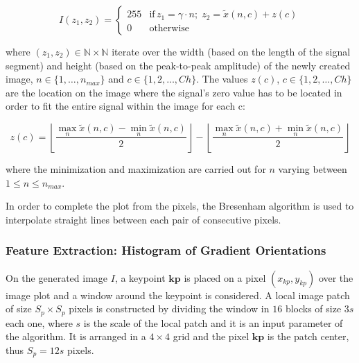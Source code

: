 \documentclass[utf8]{frontiersSCNS} %
\begin{document}
\begin{equation}
I(z_1,z_2) = \left\{ \begin{array}{rl}
255 & \text{if} \,  z_1 = \gamma \cdot n; \; z_2 = \tilde{x}(n,c) + z(c) \\
0   & \mbox{otherwise}
\end{array}\right.
\label{eq:images}
\end{equation}


\noindent where $ (z_1,z_2) \in \mathbb{N} \times \mathbb{N}$ iterate over the width (based on the length of the signal segment) and height (based on the peak-to-peak amplitude) of the newly created image,  $n \in \{1, \dots, n_{max}\}$ and $c \in \{1,2,\dots,Ch\}$.  The values $z(c)$, $c \in \{1,2,\dots,Ch\}$ are the location on the image where the signal's zero value has to be located in order to fit the entire signal within the image for each c:

\begin{equation}
z(c) = \left \lfloor{ \frac{\max_{n} \tilde{x}(n,c)  - \min_{n} \tilde{x}(n,c) }{2} }\right \rfloor -   \left \lfloor{ \frac{\max_{n} \tilde{x}(n,c)  + \min_{n} \tilde{x}(n,c)}{ 2} }\right \rfloor
\label{eq:zerolevel}
\end{equation}

\noindent where the minimization and maximization are carried out for $n$ varying between ${1 \leq n\leq n_{max}}$.
  
In order to complete the plot from the pixels, the Bresenham \citep{Bresenham1965,Ramele2016} algorithm is used to interpolate straight lines between each pair of  consecutive pixels.


\subsubsection{Feature Extraction: Histogram of Gradient Orientations}
\label{SIFT}



On the generated image $I$, a keypoint $\mathbf{kp}$ is placed on a pixel $(x_{kp}, y_{kp})$ over the image plot and a window around the keypoint is considered. A local image patch of size $S_p \times S_p$ pixels is constructed by dividing the window in $16$ blocks of size $3s$ each one,  where $s$ is the scale of the local patch and it is an input parameter of the algorithm. It is arranged in a $4 \times 4$ grid and the pixel $ \mathbf{kp}$ is the patch center, thus $S_p = 12s $ pixels. 
\end{document}
